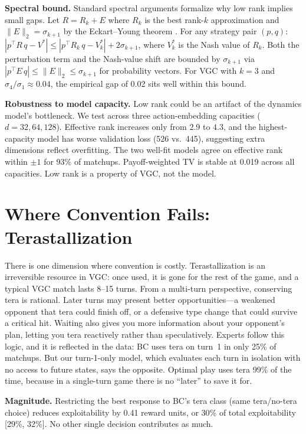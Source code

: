 \documentclass{article}
\begin{document}
\textbf{Spectral bound.} Standard spectral arguments formalize why low rank implies small gaps. Let $R = R_k + E$ where $R_k$ is the best rank-$k$ approximation and $\|E\|_2 = \sigma_{k+1}$ by the Eckart--Young theorem \citep{eckart1936approximation}. For any strategy pair $(p, q)$: $|p^\top R\, q - V^*| \leq |p^\top R_k\, q - V^*_k| + 2\sigma_{k+1}$, where $V^*_k$ is the Nash value of $R_k$. Both the perturbation term and the Nash-value shift are bounded by $\sigma_{k+1}$ via $|p^\top E\, q| \leq \|E\|_2 \leq \sigma_{k+1}$ for probability vectors. For VGC with $k = 3$ and $\sigma_4 / \sigma_1 \approx 0.04$, the empirical gap of 0.02 sits well within this bound.

\textbf{Robustness to model capacity.} Low rank could be an artifact of the dynamics model's bottleneck. We test across three action-embedding capacities ($d = 32, 64, 128$). Effective rank increases only from 2.9 to 4.3, and the highest-capacity model has worse validation loss (526 vs.\ 445), suggesting extra dimensions reflect overfitting. The two well-fit models agree on effective rank within $\pm 1$ for 93\% of matchups. Payoff-weighted TV is stable at 0.019 across all capacities. Low rank is a property of VGC, not the model.

\section{Where Convention Fails: Terastallization}
\label{sec:tera}

There is one dimension where convention is costly. Terastallization is an irreversible resource in VGC: once used, it is gone for the rest of the game, and a typical VGC match lasts 8--15 turns. From a multi-turn perspective, conserving tera is rational. Later turns may present better opportunities---a weakened opponent that tera could finish off, or a defensive type change that could survive a critical hit. Waiting also gives you more information about your opponent's plan, letting you tera reactively rather than speculatively. Experts follow this logic, and it is reflected in the data: BC uses tera on turn~1 in only 25\% of matchups. But our turn-1-only model, which evaluates each turn in isolation with no access to future states, says the opposite. Optimal play uses tera 99\% of the time, because in a single-turn game there is no ``later'' to save it for.

\textbf{Magnitude.} Restricting the best response to BC's tera class (same tera/no-tera choice) reduces exploitability by 0.41 reward units, or 30\% of total exploitability [29\%, 32\%]. No other single decision contributes as much.
\end{document}
